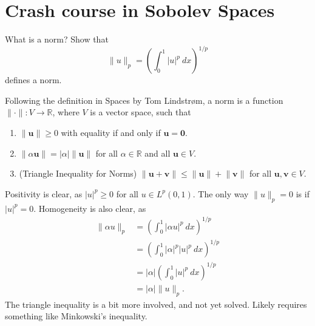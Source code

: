 \section{Crash course in Sobolev Spaces}

\begin{exercise}
    What is a norm?
    Show that
    \begin{equation*}
        \lVert u \rVert_p = \left( \int_{0}^{1} \lvert u \rvert^p \ dx \right)^{1/p}
    \end{equation*}
    defines a norm.
\end{exercise}

\begin{solution}
    Following the definition in Spaces by Tom Lindstrøm, a norm is a function $\lVert \cdot \rVert: V \to \mathbb{R}$, where $V$ is a vector space, such that
    \begin{enumerate}[label=(\roman*)] %
        \item $\lVert \boldsymbol{u} \rVert \geq 0$ with equality if and only if $\boldsymbol{u} = \boldsymbol{0}$.

        \item $\lVert \alpha \boldsymbol{u} \rVert = \lvert \alpha \rvert \lVert \boldsymbol{u} \rVert$ for all $\alpha \in \mathbb{R}$ and all $\boldsymbol{u} \in V$.

        \item (Triangle Inequality for Norms) $\lVert \boldsymbol{u} + \boldsymbol{v} \rVert \leq \lVert \boldsymbol{u} \rVert + \lVert \boldsymbol{v} \rVert$ for all $\boldsymbol{u}, \boldsymbol{v} \in V$.
    \end{enumerate}

    Positivity is clear, as $\lvert u \rvert^p \geq 0$ for all $u \in L^p(0, 1)$.
    The only way $\lVert u \rVert_p = 0$ is if $\lvert u \rvert^p = 0$.
    Homogeneity is also clear, as
    \begin{align*}
        \lVert \alpha u \rVert_p &= \left( \int_{0}^{1} \lvert \alpha u \rvert^p \ dx \right)^{1/p} \\
        &= \left( \int_{0}^{1} \lvert \alpha \rvert^p \lvert u \rvert^p \ dx \right)^{1/p} \\
        &= \lvert \alpha \rvert \left( \int_{0}^{1} \lvert u \rvert^p \ dx \right)^{1/p} \\
        &= \lvert \alpha \rvert \lVert u \rVert_p.
    \end{align*}
    The triangle inequality is a bit more involved, and not yet solved.
    Likely requires something like Minkowski's inequality.
\end{solution}

